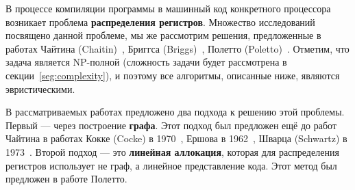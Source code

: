 В процессе компиляции программы в машинный код конкретного процессора возникает проблема \textbf{распределения регистров}. %
Множество исследований посвящено данной проблеме, мы же рассмотрим решения,
предложенные в работах Чайтина (Chaitin)~\cite{chaitin1982}, Бриггса (Briggs)~\cite{briggs1994},
Полетто (Poletto)~\cite{poletto1999}. %
Отметим, что задача является NP-полной (сложность задачи будет рассмотрена в секции~\ref{seg:complexity}),
и поэтому все алгоритмы, описанные ниже, являются эвристическими.

В рассматриваемых работах предложено два подхода к решению этой проблемы. 
Первый — через построение \textbf{графа}.
Этот подход был предложен ещё до работ Чайтина в работах Кокке (Cocke) в 1970~\cite{cocke1970},
Ершова в 1962~\cite{ershov1962}, Шварца (Schwartz) в 1973~\cite{schwartz1973}. %
Второй подход — это \textbf{линейная аллокация},
которая для распределения регистров использует не граф, а линейное представление кода.
Этот метод был предложен в работе Полетто.
